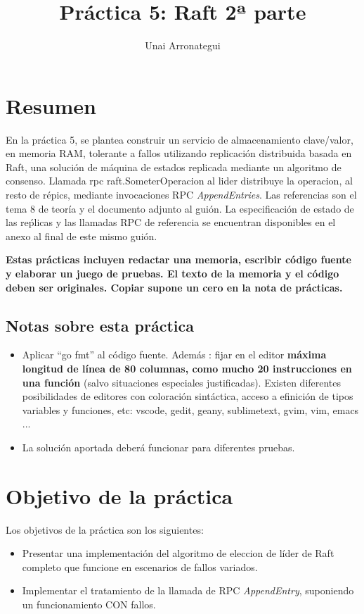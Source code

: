 \documentclass{unizarpractice}
\author{Unai Arronategui}
\title{Práctica 5: Raft 2ª parte}
\begin{document}
\maketitle


\section*{Resumen}

En la práctica 5, se plantea construir un servicio de almacenamiento clave/valor, en memoria RAM, tolerante a fallos utilizando replicación distribuida basada en Raft, una solución de máquina de estados replicada mediante un algoritmo de consenso. Llamada rpc raft.SometerOperacion al lider distribuye la operacion, al resto de répics, mediante invocaciones RPC \textit{AppendEntries}. Las referencias son el tema 8 de teoría y el documento adjunto al guión. La especificación de estado de las reṕlicas y las llamadas RPC de referencia se encuentran disponibles en el anexo al final de este mismo guión.

\textbf{Estas prácticas incluyen redactar una memoria, escribir código fuente y elaborar un juego de pruebas. El texto de la memoria  y el código deben ser originales. Copiar supone un cero en la nota de prácticas.}


\subsection*{Notas sobre esta práctica}
\begin{itemize}
    \item Aplicar “go fmt” al código fuente. Además : fijar en el editor \textbf{máxima longitud de línea de 80 columnas, como mucho 20 instrucciones en una función} (salvo situaciones especiales justificadas). Existen diferentes posibilidades de editores con coloración sintáctica, acceso a efinición de tipos variables y funciones, etc:  vscode, gedit, geany, sublimetext, gvim, vim, emacs ...
    \item La solución aportada deberá funcionar para diferentes pruebas.
\end{itemize}


\setlength{\parskip}{\baselineskip}
\section{Objetivo de la práctica}

\noindent Los objetivos de la práctica son los siguientes:
\begin{itemize}[topsep=-0.5\baselineskip]
   \item Presentar  una implementación del algoritmo de eleccion de líder de Raft completo que funcione en escenarios  de fallos variados.
   \item Implementar el tratamiento de la llamada de RPC \textit{AppendEntry}, suponiendo un funcionamiento CON fallos.

\end{itemize}
\end{document}
